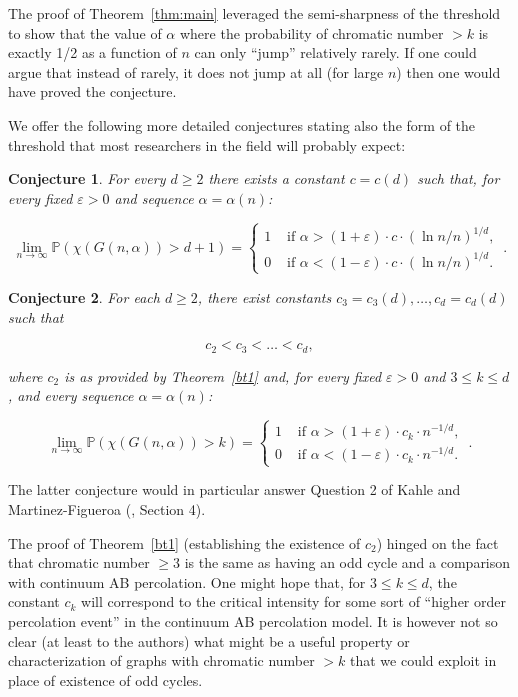 \documentclass[11pt]{article}%
\newtheorem{conjecture}[conjecture]{Conjecture}
\newcommand{\Pee}[0]{\ensuremath{{\mathbb P}}}
\newcommand{\eps}{\varepsilon}
\begin{document}
\noindent
The proof of Theorem~\ref{thm:main} leveraged the semi-sharpness of the threshold to show that the value of 
$\alpha$ where the probability of chromatic number $> k$ is exactly 1/2
as a function of $n$ 
can only ``jump'' relatively rarely. If one could argue that instead of rarely, it does not jump at all (for 
large $n$) then one would have proved the conjecture. 

We offer the following more detailed conjectures stating also the form of the threshold that 
most researchers in the field will probably expect:

\begin{conjecture}\label{conj:d+2}
For every $d\geq 2$ there exists a constant $c=c(d)$ such that, for every fixed $\eps>0$
and sequence $\alpha=\alpha(n)$:

$$ \lim_{n\to\infty}\Pee(  \chi(G(n,\alpha)) > d+1 ) = 
\begin{cases}
1 & \text{ if $\alpha > (1+\eps)\cdot c\cdot (\ln n /n)^{1/d}$, } \\
0 & \text{ if $\alpha < (1-\eps)\cdot c\cdot (\ln n /n)^{1/d}$. }
\end{cases}. $$

\end{conjecture}

\begin{conjecture}\label{conj:conjk}
For each $d\geq 2$, there exist constants $c_3=c_3(d),\dots,c_{d}=c_{d}(d)$ such that 

$$ c_2 < c_3 < \dots < c_{d}, $$ 

\noindent 
where $c_2$ is as provided by Theorem~\ref{bt1} and, for every fixed $\eps>0$
and $3 \leq k \leq d$, and every sequence $\alpha=\alpha(n)$:

$$ 
\lim_{n\to\infty}\Pee(  \chi(G(n,\alpha)) > k ) = 
\begin{cases}
1 & \text{ if $\alpha > (1+\eps)\cdot c_k\cdot n^{-1/d}$, } \\
0 & \text{ if $\alpha < (1-\eps)\cdot c_k\cdot n^{-1/d}$. }
\end{cases}. $$

\end{conjecture}

\noindent
The latter conjecture would in particular answer Question 2 of Kahle and Martinez-Figueroa (\cite{KahleFig}, Section 4).

The proof of Theorem~\ref{bt1} (establishing the existence of $c_2$) hinged on the 
fact that chromatic number $\geq 3$ is the same as having an odd cycle and 
a comparison with continuum AB percolation.
One might hope that, for $3 \leq k\leq d$, the constant $c_k$ will correspond to the 
critical intensity for some sort of ``higher order percolation event'' in the continuum AB percolation model. 
It is however not so clear (at least to the authors) what might be a useful property or characterization of graphs with chromatic 
number $> k$ that we could exploit in place of existence of odd cycles.
\end{document}
